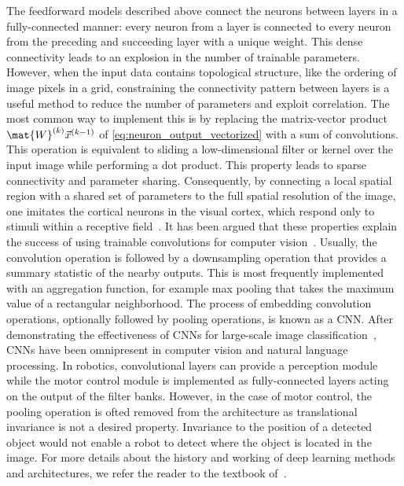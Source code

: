 The feedforward models described above connect the neurons between layers in a fully-connected manner: every neuron from a layer is connected to every neuron from the preceding and succeeding layer with a unique weight. This dense connectivity leads to an explosion in the number of trainable parameters. However, when the input data contains topological structure, like the ordering of image pixels in a grid, constraining the connectivity pattern between layers is a useful method to reduce the number of parameters and exploit correlation. The most common way to implement this is by replacing the matrix-vector product $\mat{W}^{(k)} \vec{x}^{(k-1)}$ of \cref{eq:neuron_output_vectorized} with a sum of convolutions. This operation is equivalent to sliding a low-dimensional filter or kernel over the input image while performing a dot product. This property leads to sparse connectivity and parameter sharing. Consequently, by connecting a local spatial region with a shared set of parameters to the full spatial resolution of the image, one imitates the cortical neurons in the visual cortex, which respond only to stimuli within a receptive field~\autocite{hubel1959receptive}. It has been argued that these properties explain the success of using trainable convolutions for computer vision~\autocite{Goodfellow2016}. Usually, the convolution operation is followed by a downsampling operation that provides a summary statistic of the nearby outputs. This is most frequently implemented with an aggregation function, for example max pooling that takes the maximum value of a rectangular neighborhood. The process of embedding convolution operations, optionally followed by pooling operations, is known as a \gls{CNN}. After demonstrating the effectiveness of \glspl{CNN} for large-scale image classification~\autocite{Krizhevsky2012}, \glspl{CNN} have been omnipresent in computer vision and natural language processing. In robotics, convolutional layers can provide a perception module while the motor control module is implemented as fully-connected layers acting on the output of the filter banks. However, in the case of motor control, the pooling operation is ofted removed from the architecture as translational invariance is not a desired property. Invariance to the position of a detected object would not enable a robot to detect where the object is located in the image. For more details about the history and working of deep learning methods and architectures, we refer the reader to the textbook of~\textcite{Goodfellow2016}.
